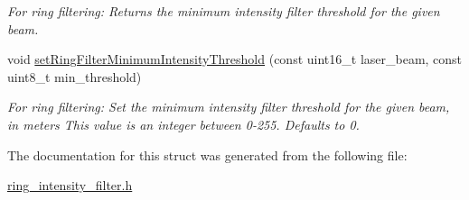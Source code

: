 \begin{DoxyCompactItemize}
\begin{DoxyCompactList}\small\item\em For ring filtering\-: Returns the minimum intensity filter threshold for the given beam. \end{DoxyCompactList}\item 
\hypertarget{structquanergy_1_1client_1_1RingIntensityFilter_a8e3e385038a4cba1f079012c0208f76d}{void \hyperlink{structquanergy_1_1client_1_1RingIntensityFilter_a8e3e385038a4cba1f079012c0208f76d}{set\-Ring\-Filter\-Minimum\-Intensity\-Threshold} (const uint16\-\_\-t laser\-\_\-beam, const uint8\-\_\-t min\-\_\-threshold)}\label{structquanergy_1_1client_1_1RingIntensityFilter_a8e3e385038a4cba1f079012c0208f76d}

\begin{DoxyCompactList}\small\item\em For ring filtering\-: Set the minimum intensity filter threshold for the given beam, in meters This value is an integer between 0-\/255. Defaults to 0. \end{DoxyCompactList}\end{DoxyCompactItemize}


The documentation for this struct was generated from the following file\-:\begin{DoxyCompactItemize}
\item 
\hyperlink{ring__intensity__filter_8h}{ring\-\_\-intensity\-\_\-filter.\-h}\end{DoxyCompactItemize}
